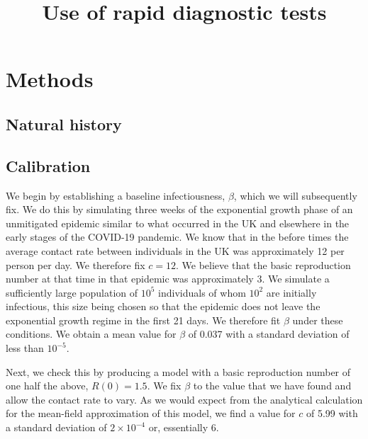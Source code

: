 \documentclass{amsart}
\title{Use of rapid diagnostic tests}
\begin{document}
\section{Methods}

\begin{figure}
\end{figure}


\subsection{Natural history}


\subsection{Calibration}
We begin by establishing a baseline infectiousness, $\beta$, which we will
subsequently fix. We do this by simulating three weeks of the exponential growth
phase of an unmitigated epidemic similar to what occurred in the UK and
elsewhere in the early stages of the COVID-19 pandemic. We know that in the
before times the average contact rate between individuals in the UK was
approximately 12 per person per day. We therefore fix $c = 12$. We believe that
the basic reproduction number at that time in that epidemic was approximately 3.
We simulate a sufficiently large population of $10^5$ individuals of whom $10^2$
are initially infectious, this size being chosen so that the epidemic does not
leave the exponential growth regime in the first 21 days. We therefore fit
$\beta$ under these conditions.  We obtain a mean value for $\beta$ of
0.037 with a standard deviation of less than $10^{-5}$.

Next, we check this by producing a model with a basic reproduction number of one
half the above, $R(0) = 1.5$. We fix $\beta$ to the value that we have found and
allow the contact rate to vary. As we would expect from the analytical
calculation for the mean-field approximation of this model, we find a value for
$c$ of 5.99 with a standard deviation of $2\times 10^{-4}$ or, essentially 6.
\end{document}
